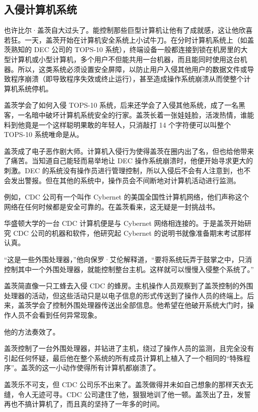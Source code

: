 \documentclass[12pt,UTF8]{ctexbook}
\begin{document}
\subsection{入侵计算机系统}


也许比尔·盖茨自大过头了。能控制那些巨型计算机让他有了成就感，这让他欣喜若狂。一天，盖茨开始在计算机安全系统上小试牛刀。在分时计算机系统上（如盖茨熟知的 DEC 公司的 TOPS-10 系统），终端设备一般都连接到锁在机房里的大型计算机或小型计算机，多个用户不但能共用一台机器，而且能同时使用这台机器。所以，这类系统必须设置安全屏障，以防止用户入侵其他用户的数据文件或导致程序崩溃（即导致程序失效或终止运行），甚至造成操作系统崩溃从而使整个计算机系统停机。

盖茨学会了如何入侵 TOPS-10 系统，后来还学会了入侵其他系统，成了一名黑客，一名暗中破坏计算机系统安全的行家。盖茨长着一张娃娃脸，活泼热情，谁能料到他竟是一个这样聪明果敢的年轻人，只消敲打 14 个字符便可以叫整个 TOPS-10 系统唯命是从。

盖茨成了电子恶作剧大师。计算机入侵行为使得盖茨在圈内出了名，但也给他带来了痛苦。当知道自己能轻而易举地让 DEC 操作系统崩溃时，他便开始寻求更大的刺激。DEC 的系统没有操作员进行管理控制，所以入侵后不会有人注意到，也不会发出警报。但在其他的系统中，操作员会不间断地对计算机活动进行监测。

例如，CDC 公司有一个叫作 Cybernet 的美国全国性计算机网络，他们声称这个网络在任何时候都是安全可靠的。在盖茨看来，这无疑是一封挑战书。

华盛顿大学的一台 CDC 计算机便是与 Cybernet 网络相连接的。于是盖茨开始研究 CDC 公司的机器和软件，他研究起 Cybernet 的说明书就像准备期末考试那样认真。

“这是一些外围处理器，”他向保罗·艾伦解释道，“要将系统玩弄于鼓掌之中，只消控制其中一个外围处理器，就能控制整台主机。这样就可以慢慢入侵整个系统了。”

盖茨简直像一只工蜂去入侵 CDC 的蜂房。主机操作人员观察到了盖茨控制的外围处理器的活动，但这些活动只是以电子信息的形式传送到了操作人员的终端上。后来，盖茨学会了控制外围处理器传送出全部信息。他希望在他破开系统大门时，操作人员不会看到任何异常现象。

他的方法奏效了。

盖茨控制了一台外围处理器，并钻进了主机，绕过了操作人员的监测，且完全没有引起任何怀疑，最后他在整个系统的所有成员计算机上植入了一个相同的“特殊程序”。盖茨的这一小动作使得所有计算机都崩溃了。

盖茨乐不可支，但 CDC 公司乐不出来了。盖茨做得并未如自己想象的那样天衣无缝，令人无迹可寻。CDC 公司逮住了他，狠狠地训了他一顿。盖茨出了丑，发誓再也不搞计算机了，而且真的坚持了一年多的时间。
\end{document}
